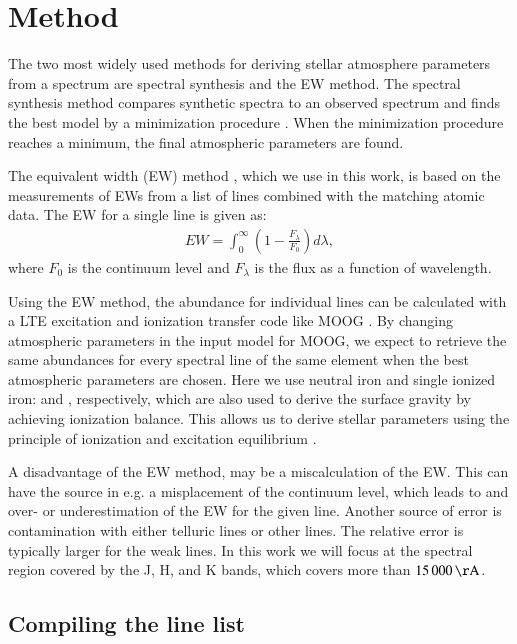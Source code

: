\documentclass{aa}
\begin{document}
\section{Method}
\label{sec:method}

The two most widely used methods for deriving stellar atmosphere
parameters from a spectrum are spectral synthesis and the EW method.
The spectral synthesis method compares synthetic spectra
to an observed spectrum and finds the best model by a minimization
procedure \citep[see e.g.][]{Valenti2005,Onehag2012,Blanco2014}. When
the minimization procedure reaches a minimum, the final atmospheric
parameters are found.

The equivalent width (EW) method
\citep[see e.g.][]{Sousa2008a,Bensby2014,Mucciarelli2013}, which we use in this
work, is based on the measurements of EWs from a list of lines combined with
the matching atomic data.
The EW for a single line is given as:
\begin{align}
    \label{eq:EW}
    EW = \int_0^\infty \left(1 - \frac{F_\lambda}{F_0}\right) d\lambda,
\end{align}
where $F_0$ is the continuum level and $F_\lambda$ is the flux as a
function of wavelength.

Using the EW method, the abundance for individual lines can be
calculated with a LTE excitation and ionization transfer code like
MOOG \citep{Sneden1973}. By changing atmospheric parameters in the
input model for MOOG, we expect to retrieve the same abundances for
every spectral line of the same element when the best atmospheric
parameters are chosen. Here we use neutral iron and single ionized
iron:  and , respectively, which are also used
to derive the surface gravity by achieving ionization balance. This allows
us to derive stellar parameters using the principle of ionization and
excitation equilibrium \citep[see e.g.][]{Gray2006}.

A disadvantage of the EW method, may be a miscalculation of the EW. This
can have the source in e.g. a misplacement of the continuum level,
which leads to and over- or underestimation of the EW for the given line.
Another source of error is contamination with either telluric lines
or other lines. The
relative error is typically larger for the weak lines. In this work we
will focus at the spectral region covered by the J, H, and K bands,
which covers more than $\SI{15000}{\AA}$.



\subsection{Compiling the line list}
\end{document}
